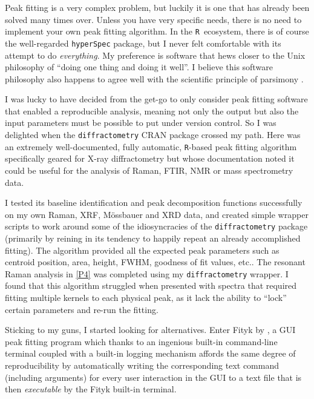 \documentclass[draft,webedition,openright,titles,swedish,english]{LuaUUThesis}\usepackage[]{graphicx}\usepackage[]{xcolor}
\newcommand{\R}{\texttt{R}}
\newcommand{\Rpackage}[1]{\texttt{#1}}
\newcommand{\etc}{etc.}
\begin{document}
Peak fitting is a very complex problem, but luckily it is one that has already
been solved many times over. Unless you have very
specific needs, there is no need to implement your own peak fitting algorithm.
In the \R\ ecosystem, there is of course the well-regarded \Rpackage{hyperSpec} package,
but I never felt comfortable with its attempt to do \emph{everything}.
My preference is software that hews closer to the Unix philosophy of
\enquote{doing one thing and doing it well}. I believe this software philosophy
also happens to agree well with the scientific principle
of parsimony \cite{Gauch2003}.

I was lucky to have decided from the get-go to only consider peak fitting
software that enabled a reproducible analysis, meaning not only the output
but also the input parameters must be possible to put under version control.
So I was delighted when the \texttt{diffractometry} CRAN package crossed my path.
Here was an extremely well-documented, fully automatic, \R-based peak fitting
algorithm \cite{Davies2008}
specifically geared for X-ray diffractometry but whose documentation \cite{Davies2010}
noted it could be useful for the analysis of Raman, FTIR, NMR or mass spectrometry data.

I tested its baseline identification and peak decomposition functions successfully
on my own Raman, \gls{XRF}, Mössbauer and \gls{XRD} data, and created simple
wrapper scripts to work around some of the idiosyncracies of the \texttt{diffractometry}
package (primarily by reining in its tendency to happily repeat an already accomplished fitting).
The algorithm provided all the expected peak parameters such as centroid position,
area, height, \gls{FWHM}, goodness of fit values, \etc.
The resonant Raman analysis in \cref{P4} was completed using my \texttt{diffractometry} wrapper.
I found that this algorithm struggled when presented with spectra that required
fitting multiple kernels to each physical peak, as it lack the ability to \enquote{lock}
certain parameters and re-run the fitting.

Sticking to my guns, I started looking for alternatives.
Enter Fityk by \textcite{Wojdyr2010}, a GUI peak fitting program which thanks to
an ingenious built-in command-line terminal coupled with a built-in logging
mechanism affords the same degree of reproducibility by
automatically writing the corresponding text command (including arguments) for
every user interaction in the GUI to a text file that is then \emph{executable}
by the Fityk built-in terminal.
\end{document}
